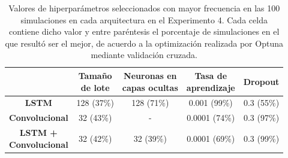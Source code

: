 \documentclass[../../main.tex]{subfiles}
\begin{document}
\begin{table}[H]
    \centering
    \renewcommand{\arraystretch}{1.2}
    \begin{tabular}{|c|c|c|c|c|}
        \hline
            & \makecell{\textbf{Tamaño}\\\textbf{de lote}}
            & \makecell{\textbf{Neuronas en}\\\textbf{capas ocultas}}
            & \makecell{\textbf{Tasa de}\\\textbf{aprendizaje}}
            & \textbf{Dropout} \\ \hline\hline
        \textbf{LSTM}
            & 128 (37\%) & 128 (71\%) & 0.001 (99\%)  & 0.3 (55\%) \\ \hline
        \textbf{Convolucional}
            & 32 (43\%) & -           & 0.0001 (74\%) & 0.3 (97\%) \\ \hline
        \makecell{\textbf{LSTM +}\\\textbf{Convolucional}}
            & 32 (42\%) & 32 (39\%)   & 0.0001 (69\%) & 0.3 (99\%) \\
        \hline
    \end{tabular}
    \caption{Valores de hiperparámetros seleccionados con mayor frecuencia en las 100
    simulaciones en cada arquitectura en el Experimento 4. Cada celda contiene dicho valor
    y entre paréntesis el porcentaje de simulaciones en el que resultó ser el mejor, de
    acuerdo a la optimización realizada por Optuna mediante validación cruzada.}
    \label{tab:hyperparams_exp4}
\end{table}
\end{document}
